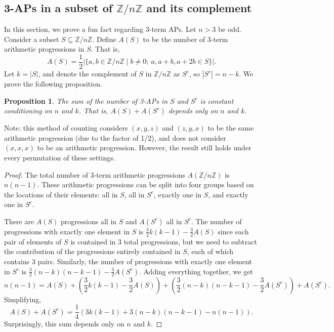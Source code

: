 \documentclass[12pt]{article} %
\newcommand{\f}[2]{\frac{#1}{#2}}
\newcommand{\p}[1]{\left(#1\right)}
\newcommand{\abs}[1]{\left\lvert#1\right\rvert}
\newcommand{\Z}{\mathbb{Z}}
\newtheorem{prop}[thm]{Proposition}
\theoremstyle{definition}
\theoremstyle{definition}
\begin{document}
\subsection{3-APs in a subset of $\Z/n\Z$ and its complement}
In this section, we prove a fun fact regarding 3-term APs.
	Let $n > 3$ be odd. Consider a subset $S \subseteq \Z/n\Z$. Define $A(S)$ to be the number of 3-term arithmetic progressions in $S$. That is,
	\[ A(S) = \frac{1}{2} \abs{\{a, b \in \Z/n\Z \mid b \neq 0;\ a, a + b, a + 2b \in S \}}. \]
	Let $k = \abs{S}$, and denote the complement of $S$ in $\Z/n\Z$ as $S^c$, so $\abs{S^c} = n - k$. We prove the following proposition.
    
    \begin{prop}
    The sum of the number of 3-APs in $S$ and $S^c$ is constant conditioning on $n$ and $k$. That is, $A(S) + A(S^c)$ depends only on $n$ and $k$.
    \end{prop}
    
    Note: this method of counting considers $(x, y, z)$ and $(z, y, x)$ to be the same arithmetic progression (due to the factor of 1/2), and does not consider $(x, x, x)$ to be an arithmetic progression. However, the result still holds under every permutation of these settings.

\begin{proof}

	The total number of 3-term arithmetic progressions $A(\Z/n\Z)$ is $n(n-1)$. These arithmetic progressions can be split into four groups based on the locations of their elements: all in $S$, all in $S^c$, exactly one in $S$, and exactly one in $S^c$.

	There are $A(S)$ progressions all in $S$ and $A(S^c)$ all in $S^c$. The number of progressions with exactly one element in $S$ is $\f{3}{2}k(k-1) - \f{3}{2}A(S)$ since each pair of elements of $S$ is contained in $3$ total progressions, but we need to subtract the contribution of the progressions entirely contained in $S$, each of which contains $3$ pairs. Similarly, the number of progressions with exactly one element in $S^c$ is $\f{3}{2}(n-k)(n-k-1) - \f{3}{2}A(S^c)$. Adding everything together, we get
	\[ n(n-1) = A(S) + \p{\f{3}{2}k(k-1) - \f{3}{2}A(S)} + \p{\f{3}{2}(n-k)(n-k-1) - \f{3}{2}A(S^c)} + A(S^c). \]
	Simplifying,
	\[ A(S) + A(S^c) = \f{1}{4}\p{3k(k-1) + 3(n-k)(n-k-1) - n(n-1)}. \]
	Surprisingly, this sum depends only on $n$ and $k$.
    
\end{proof}
\end{document}
